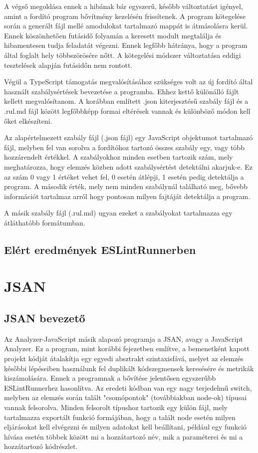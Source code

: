 A végső megoldása ennek a hibának bár egyszerű, később változtatást igényel, amint a fordító program bővítmény kezelésén frissítenek. A program kötegelése során a generált fájl mellé amodulokat tartalmazó mappát is átmásolásra kerül. Ennek köszönhetően futásidő folyamán a keresett modult megtalálja és hibamentesen tudja feladatát végezni. Ennek legfőbb hátránya, hogy a program által foglalt hely többszörösére nőtt. A kötegelési módszer változtatása eddigi tesztelések alapján futásidőn nem rontott.

Végül a TypeScript támogatás megvalósításához szükséges volt az új fordító által használt szabálysértések bevezetése a programba. Ehhez kettő különálló fájlt kellett megvalósítanom. A korábban említett .json kiterjesztésű szabály fájl és a .rul.md fájl között legfőbbképp formai eltérések vannak és különböző módon kell őket elkészíteni.

Az alapértelmezett szabály fájl (.json fájl) egy JavaScript objektumot tartalmazó fájl, melyben fel van sorolva a fordítóhoz tartozó összes szabály egy, vagy több hozzárendelt értékkel. A szabályokhoz minden esetben tartozik szám, mely meghatározza, hogy elemzés közben adott szabálysértést detektálni akarjuk-e. Ez az szám 0 vagy 1 értéket vehet fel, 0 esetén átlépji, 1 esetén pedig detektálja a program. A második érték, mely nem minden szabálynál található meg, bővebb információt tartalmaz arról hogy pontosan milyen fajtáját detektálja a program. 

A másik szabály fájl (.rul.md) ugyan ezeket a szabályokat tartalmazza egy átláthatóbb formátumban. 


\subsection{Elért eredmények ESLintRunnerben}

\section{JSAN}

\subsection{JSAN bevezető}

Az Analyzer-JavaScript másik alapozó programja a JSAN, avagy a JavaScript Analyzer. Ez a program, mint korábbi fejezetben említve, a bemenetként kapott projekt kódját átalakítja egy egyedi absztrakt szintaxisfává, melyet az elemzés későbbi lépéseiben használunk fel duplikált kódszegmensek keresésére és metrikák kiszámolására.
Ennek a programnak a bővítése jelentősen egyszerűbb ESLintRunnerhez hasonlítva. Az eredeti kódban van egy nagy terjedelmű switch, melyben az elemzés során talált "csomópontok" (továbbiakban node-ok) típusai vannak felsorolva. Minden felsorolt típushoz tartozik egy külön fájl, mely tartalmazza exportált funkció formájában, hogy a talált node esetén milyen eljárásokat kell elvégezni és milyen adatokat kell beállítani, például egy funkció hívása esetén többek között mi a hozzátartozó név, mik a paraméterei és mi a hozzátartozó kódrészlet. 


